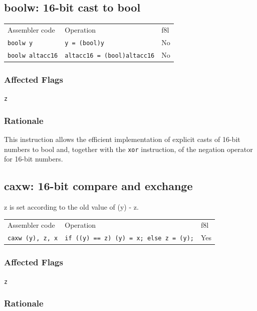 \documentclass{book}
\begin{document}
\subsection{boolw: 16-bit cast to bool}

\begin{tabular}{l l l}
Assembler code          & Operation                          & f8l \\
\texttt{boolw y}        & \texttt{y = (bool)y}               & No \\
\texttt{boolw altacc16} & \texttt{altacc16 = (bool)altacc16} & No \\
\end{tabular}

\subsubsection*{Affected Flags}

\texttt{z}

\subsubsection*{Rationale}

This instruction allows the efficient implementation of explicit casts of 16-bit numbers to bool and, together with the \texttt{xor} instruction, of the negation operator for 16-bit numbers.


\subsection{caxw: 16-bit compare and exchange}

z is set according to the old value of (y) - z.

\begin{tabular}{l l l}
Assembler code           & Operation                                     & f8l \\
\texttt{caxw (y), z, x}  & \texttt{if ((y) == z) (y) = x; else z = (y);} & Yes \\

\end{tabular}

\subsubsection*{Affected Flags}

\texttt{z}

\subsubsection*{Rationale}
\end{document}
